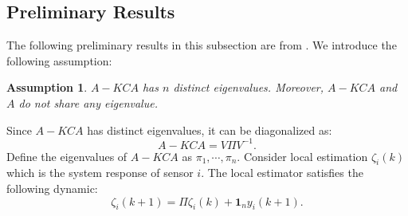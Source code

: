 \documentclass{ieeetrans}   %
\newtheorem{proposition}{\textbf{Proposition}}
\newtheorem{assumption}{\textbf{Assumption}}
\begin{document}


\subsection{Preliminary Results}\label{sec:preli}
The following preliminary results in this subsection are from \cite{liuxinghua-TAC2020}.
We introduce the following assumption:
\begin{assumption}\label{as:distinct_eigvalue}
	$A-K C A$ has $n$ distinct eigenvalues. Moreover, $A-K C A$ and $A$ do not share any eigenvalue.
\end{assumption}
Since $A-K C A$ has distinct eigenvalues, it can be diagonalized as:
\begin{equation}\label{eq:VLambda}
	A-K C A=V \Pi V^{-1}.
\end{equation}
Define the eigenvalues of $A-KCA$ as $\pi_{1},\cdots,\pi_{n}$.
Consider local estimation $\zeta_{i}(k)$ which is the system response of sensor $i$. The local estimator satisfies the following dynamic:
\begin{equation}\label{eq:def_zeta}
	\zeta_{i}(k+1)=\Pi \zeta_{i}(k)+\mathbf{1}_{n} y_{i}(k+1) .
\end{equation}
%
\end{document}
